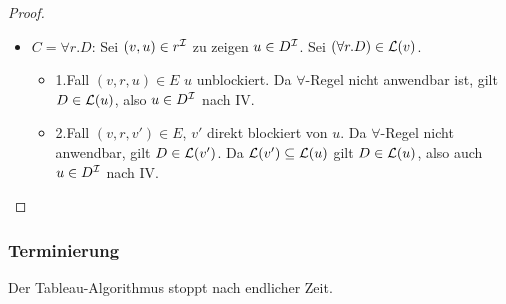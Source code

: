 \begin{proof}
\begin{tafel}
\begin{itemize}
\begin{itemize}
            \end{itemize}
        \item $C = \forall r.D$:  Sei $(v, u) \in r^{\mathcal{I}}$ zu zeigen $u \in D^{\mathcal{I}}$. Sei $(\forall r.D) \in \mathcal{L}(v)$.
            \begin{itemize}
                \item 1.Fall $(v, r, u) \in E$ $u$ unblockiert. Da $\forall$-Regel nicht anwendbar ist, gilt $D \in \mathcal{L}(u)$, also $u \in D^{\mathcal{I}}$ nach IV.
                \item 2.Fall $(v, r, v') \in E$, $v'$ direkt blockiert von $u$. Da $\forall$-Regel nicht anwendbar, gilt $D \in \mathcal{L}(v')$. Da $\mathcal{L}(v') \subseteq \mathcal{L}(u)$ gilt $D \in \mathcal{L}(u)$, also auch $u \in D^{\mathcal{I}}$ nach IV.
            \end{itemize}
    \end{itemize}
    \end{tafel}
\end{proof}

\subsubsection{Terminierung}\label{terminierung}

\begin{theorem}[Terminierung]
    \label{thm:termination2}
Der Tableau-Algorithmus stoppt nach endlicher Zeit.
\end{theorem}

